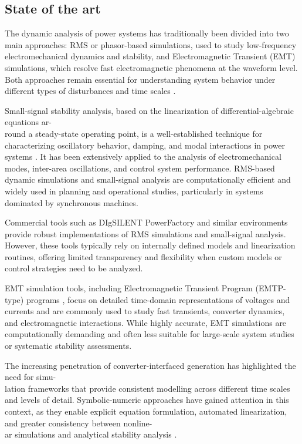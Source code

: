 \subsection{State of the art}

The dynamic analysis of power systems has traditionally been divided into two main
approaches: RMS or phasor-based simulations, used to study low-frequency
electromechanical dynamics and stability, and Electromagnetic Transient (EMT)
simulations, which resolve fast electromagnetic phenomena at the waveform level.
Both approaches remain essential for understanding system behavior under different
types of disturbances and time scales \cite{LaraTDS}.

Small-signal stability analysis, based on the linearization of differential-algebraic
equations ar-\\round a steady-state operating point, is a well-established technique for
characterizing oscillatory behavior, damping, and modal interactions in power systems \cite{StabilityAndControlKundur}.
It has been extensively applied to the analysis of electromechanical modes, inter-area
oscillations, and control system performance. RMS-based dynamic simulations and
small-signal analysis are computationally efficient and widely used in planning and
operational studies, particularly in systems dominated by synchronous machines.

Commercial tools such as DIgSILENT PowerFactory
and similar environments provide robust implementations of RMS simulations and
small-signal analysis. However, these tools typically rely on internally defined models
and linearization routines, offering limited transparency and flexibility when custom
models or control strategies need to be analyzed.

EMT simulation tools, including Electromagnetic Transient Program (EMTP-type) programs \cite{Dommel_EMTP_Theory_Book_1986}, focus on detailed time-domain
representations of voltages and currents and are commonly used to study fast transients,
converter dynamics, and electromagnetic interactions. While highly accurate, EMT
simulations are computationally demanding and often less suitable for large-scale
system studies or systematic stability assessments.

The increasing penetration of converter-interfaced generation has highlighted the need
for simu-\\lation frameworks that provide consistent modelling across different time
scales and levels of detail. Symbolic-numeric approaches have gained attention in this
context, as they enable explicit equation formulation, automated linearization, and
greater consistency between nonline-\\ar simulations and analytical stability analysis \cite{SymbolicHantao}.

